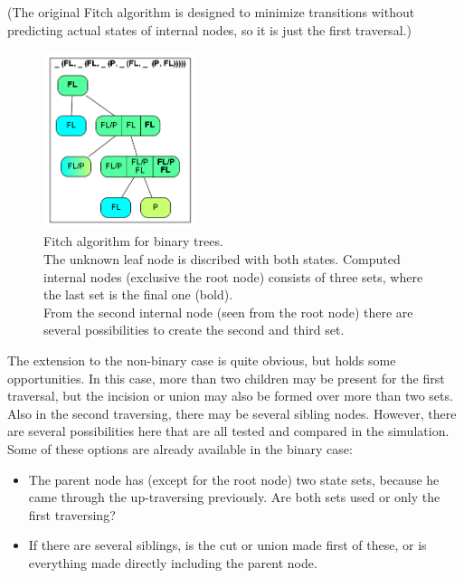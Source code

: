       (The original Fitch algorithm is designed to minimize transitions without predicting actual states 
        of internal nodes, so it is just the first traversal.) \\
        \begin{figure}
          \centering
          \includegraphics[width=0.4\textwidth]{Figures/Fitch1.png}
          \caption{Fitch algorithm for binary trees. \\
            The unknown leaf node is discribed with both states. Computed internal nodes (exclusive the 
            root node) consists of three sets, where the last set is the final one (bold). \\
            From the second internal node (seen from the root node) there are several possibilities to 
            create the second and third set.}
          \label{fig: binary Fitch}
        \end{figure}
      The extension to the non-binary case is quite obvious, but holds some opportunities. In this case, 
        more than two children may be present for the first traversal, but the incision or union may 
        also be formed over more than two sets. Also in the second traversing, there may be several 
        sibling nodes. However, there are several possibilities here that are all tested and compared 
        in the simulation. Some of these options are already available in the binary case:
      \begin{itemize}
        \item The parent node has (except for the root node) two state sets, because he came through 
          the up-traversing previously. Are both sets used or only the first traversing?
        \item If there are several siblings, is the cut or union made first of these, or is everything 
          made directly including the parent node.
      \end{itemize}
